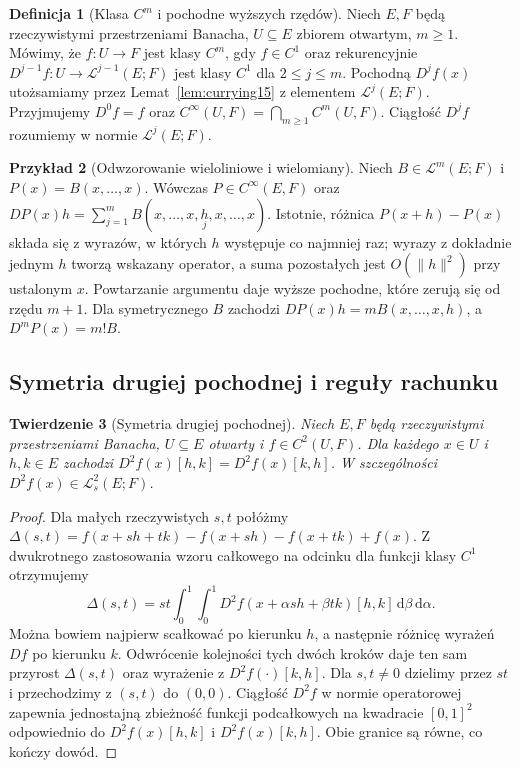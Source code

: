 \documentclass[11pt,a4paper]{article}
\numberwithin{equation}{section}
\theoremstyle{plain}
\newtheorem{twierdzenie}{Twierdzenie}[section]
\theoremstyle{definition}
\newtheorem{definicja}[twierdzenie]{Definicja}
\newtheorem{przyklad}[twierdzenie]{Przykład}
\theoremstyle{remark}
\begin{document}
\begin{definicja}[Klasa $C^m$ i pochodne wyższych rzędów]
\label{def:ck15}
Niech $E,F$ będą rzeczywistymi przestrzeniami Banacha, $U\subseteq E$ zbiorem otwartym, $m\ge1$. Mówimy, że $f:U\to F$ jest klasy $C^m$, gdy $f\in C^1$ oraz rekurencyjnie $D^{j-1}f:U\to\mathcal L^{j-1}(E;F)$ jest klasy $C^1$ dla $2\le j\le m$. Pochodną $D^jf(x)$ utożsamiamy przez Lemat~\ref{lem:currying15} z elementem $\mathcal L^j(E;F)$. Przyjmujemy $D^0f=f$ oraz $C^\infty(U,F)=\bigcap_{m\ge1}C^m(U,F)$. Ciągłość $D^jf$ rozumiemy w normie $\mathcal L^j(E;F)$.
\end{definicja}

\begin{przyklad}[Odwzorowanie wieloliniowe i wielomiany]
\label{ex:multi-poly15}
Niech $B\in\mathcal L^m(E;F)$ i $P(x)=B(x,\ldots,x)$. Wówczas $P\in C^\infty(E,F)$ oraz
$DP(x)h=\sum_{j=1}^m B(x,\ldots,x,\underset{j}{h},x,\ldots,x)$.
Istotnie, różnica $P(x+h)-P(x)$ składa się z wyrazów, w których $h$ występuje co najmniej raz; wyrazy z dokładnie jednym $h$ tworzą wskazany operator, a suma pozostałych jest $O(\|h\|^2)$ przy ustalonym $x$. Powtarzanie argumentu daje wyższe pochodne, które zerują się od rzędu $m+1$. Dla symetrycznego $B$ zachodzi $DP(x)h=mB(x,\ldots,x,h)$, a $D^mP(x)=m!B$.
\end{przyklad}

\subsection{Symetria drugiej pochodnej i reguły rachunku}

\begin{twierdzenie}[Symetria drugiej pochodnej]
\label{thm:schwarz15}
Niech $E,F$ będą rzeczywistymi przestrzeniami Banacha, $U\subseteq E$ otwarty i $f\in C^2(U,F)$. Dla każdego $x\in U$ i $h,k\in E$ zachodzi
$D^2f(x)[h,k]=D^2f(x)[k,h]$. W szczególności $D^2f(x)\in\mathcal L_s^2(E;F)$.
\end{twierdzenie}
\begin{proof}
Dla małych rzeczywistych $s,t$ połóżmy
$\Delta(s,t)=f(x+sh+tk)-f(x+sh)-f(x+tk)+f(x)$. Z dwukrotnego zastosowania wzoru całkowego na odcinku dla funkcji klasy $C^1$ otrzymujemy
\[
\Delta(s,t)=st\int_0^1\int_0^1 D^2f(x+\alpha sh+\beta tk)[h,k] \,\mathrm d\beta\,\mathrm d\alpha.
\]
Można bowiem najpierw scałkować po kierunku $h$, a następnie różnicę wyrażeń $Df$ po kierunku $k$. Odwrócenie kolejności tych dwóch kroków daje ten sam przyrost $\Delta(s,t)$ oraz wyrażenie z $D^2f(\cdot)[k,h]$. Dla $s,t\ne0$ dzielimy przez $st$ i przechodzimy z $(s,t)$ do $(0,0)$. Ciągłość $D^2f$ w normie operatorowej zapewnia jednostajną zbieżność funkcji podcałkowych na kwadracie $[0,1]^2$ odpowiednio do $D^2f(x)[h,k]$ i $D^2f(x)[k,h]$. Obie granice są równe, co kończy dowód.
\end{proof}
\end{document}
